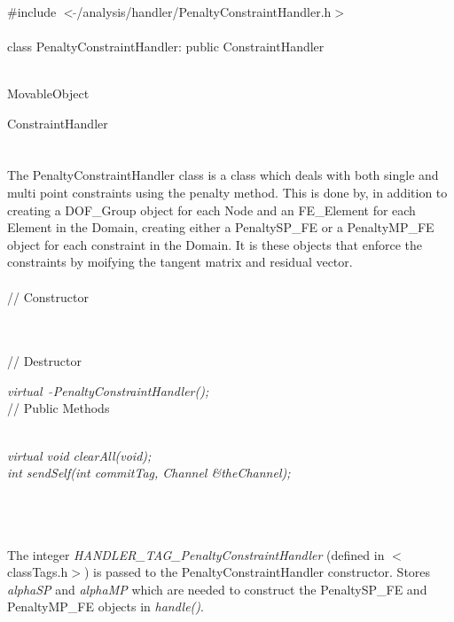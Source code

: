 
   \\
\indent \#include $<\tilde{
}$/analysis/handler/PenaltyConstraintHandler.h$>$  \\ 

  \\
class PenaltyConstraintHandler: public ConstraintHandler  


 \\
MovableObject 

\indent\indent ConstraintHandler \\
\indent\indent{} \\

 \\ 
\indent The PenaltyConstraintHandler class is a class which deals with
both single and multi point constraints using the penalty method. 
This is done by, in addition to creating a DOF\_Group object
for each Node and an FE\_Element for each Element in the Domain,
creating either a PenaltySP\_FE or a PenaltyMP\_FE object for each
constraint in the Domain. It is these objects that enforce the
constraints by moifying the tangent matrix and residual vector. \\ 


 \\
// Constructor 

\\  \\ 
// Destructor 

{\em virtual~ $\tilde{}$PenaltyConstraintHandler();}\\  

// Public Methods

 \\ 
{\em virtual void clearAll(void);} \\ 

{\em int sendSelf(int commitTag, Channel \&theChannel); } 

 \\


 \\
\\ 
The integer {\em HANDLER\_TAG\_PenaltyConstraintHandler} (defined in
$<$classTags.h$>$) is passed to the PenaltyConstraintHandler
constructor. Stores {\em alphaSP} and {\em alphaMP} which are needed
to construct the PenaltySP\_FE and PenaltyMP\_FE objects in {\em
handle()}. \\

